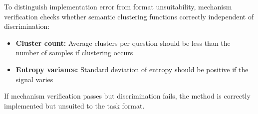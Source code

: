 To distinguish implementation error from format unsuitability, mechanism verification checks whether semantic clustering functions correctly independent of discrimination:

\begin{itemize}
\item \textbf{Cluster count:} Average clusters per question should be less than the number of samples if clustering occurs
\item \textbf{Entropy variance:} Standard deviation of entropy should be positive if the signal varies
\end{itemize}

If mechanism verification passes but discrimination fails, the method is correctly implemented but unsuited to the task format.

